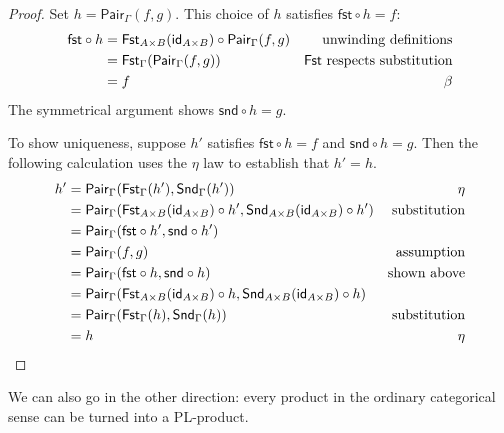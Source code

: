 \begin{proof}
  Set \(h = \mathsf{Pair}_\Gamma(f,g)\). This choice of \(h\) satisfies \(\mathsf{fst}\circ h = f\):
  \begin{align*}
    \mathsf{fst} \circ h
    &= \mathsf{Fst}_{A\times B}(\mathsf{id}_{A\times B}) \circ \mathsf{Pair}_{\Gamma}(f,g) & \text{unwinding definitions} \\
    &= \mathsf{Fst}_{\Gamma}(\mathsf{Pair}_{\Gamma}(f,g)) & \text{\(\mathsf{Fst}\) respects substitution} \\
    &= f & \text{\(\beta\)}
  \end{align*}
  The symmetrical argument shows \(\mathsf{snd} \circ h = g\).

  To show uniqueness, suppose \(h'\) satisfies \(\mathsf{fst} \circ h = f\) and \(\mathsf{snd} \circ h = g\).
  Then the following calculation uses the \(\eta\) law to establish that \(h' = h\).
  \begin{align*}
    h' &= \mathsf{Pair}_\Gamma(\mathsf{Fst}_\Gamma(h'),\mathsf{Snd}_\Gamma(h')) & \text{\(\eta\)} \\
     &= \mathsf{Pair}_\Gamma(\mathsf{Fst}_{A\times B}(\mathsf{id}_{A\times B})\circ h',\mathsf{Snd}_{A\times B}(\mathsf{id}_{A\times B})\circ h') & \text{substitution} \\
     &= \mathsf{Pair}_\Gamma(\mathsf{fst}\circ h',\mathsf{snd}\circ h') & \\
     &= \mathsf{Pair}_\Gamma(f,g) & \text{assumption} \\
     &= \mathsf{Pair}_\Gamma(\mathsf{fst}\circ h,\mathsf{snd} \circ h) & \text{shown above} \\
     &= \mathsf{Pair}_\Gamma(\mathsf{Fst}_{A\times B}(\mathsf{id}_{A\times B})\circ h,\mathsf{Snd}_{A\times B}(\mathsf{id}_{A\times B}) \circ h) & \\
     &= \mathsf{Pair}_\Gamma(\mathsf{Fst}_\Gamma(h),\mathsf{Snd}_\Gamma(h)) & \text{substitution} \\
     &= h & \text{\(\eta\)}
  \end{align*}

\end{proof}

We can also go in the other direction: every product in the ordinary categorical sense can be turned into a PL-product.

